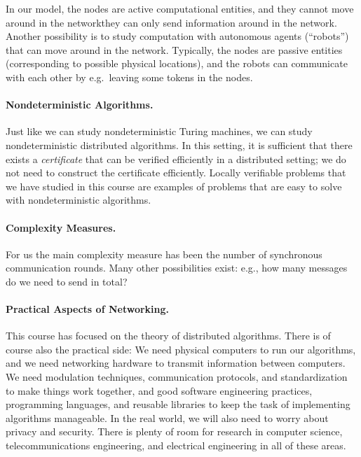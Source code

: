 In our model, the nodes are active computational entities, and they cannot move around in the network\mydash they can only send information around in the network. Another possibility is to study computation with autonomous agents (``robots'') that can move around in the network. Typically, the nodes are passive entities (corresponding to possible physical locations), and the robots can communicate with each other by e.g.\ leaving some tokens in the nodes.


\paragraph{Nondeterministic Algorithms.}

Just like we can study nondeterministic Turing machines, we can study nondeterministic distributed algorithms. In this setting, it is sufficient that there exists a \emph{certificate} that can be verified efficiently in a distributed setting; we do not need to construct the certificate efficiently. Locally verifiable problems that we have studied in this course are examples of problems that are easy to solve with nondeterministic algorithms.


\paragraph{Complexity Measures.}

For us the main complexity measure has been the number of synchronous communication rounds. Many other possibilities exist: e.g., how many messages do we need to send in total?


\paragraph{Practical Aspects of Networking.}

This course has focused on the theory of distributed algorithms. There is of course also the practical side: We need physical computers to run our algorithms, and we need networking hardware to transmit information between computers. We need modulation techniques, communication protocols, and standardization to make things work together, and good software engineering practices, programming languages, and reusable libraries to keep the task of implementing algorithms manageable. In the real world, we will also need to worry about privacy and security. There is plenty of room for research in computer science, telecommunications engineering, and electrical engineering in all of these areas.


